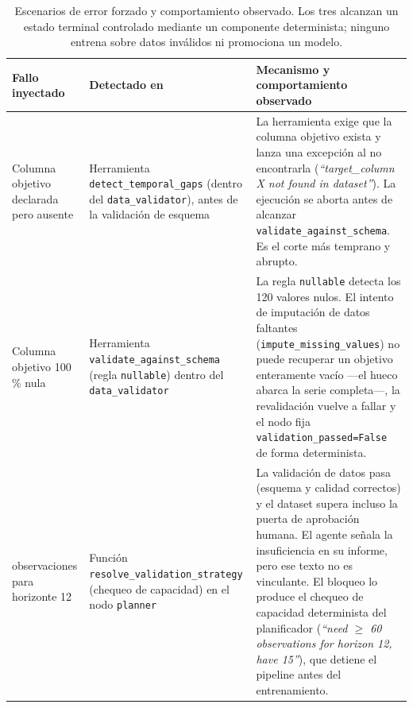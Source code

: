 \documentclass[12pt,a4paper]{article}
\theoremstyle{plain}
\begin{document}
\begin{table}[H]
\centering
\footnotesize
\setlength{\tabcolsep}{4pt}
\renewcommand{\arraystretch}{1.15}
\begin{tabularx}{\linewidth}{>{\RaggedRight\arraybackslash}p{3.2cm} >{\RaggedRight\arraybackslash}p{3.6cm} >{\RaggedRight\arraybackslash}X}
\hline
\textbf{Fallo inyectado} & \textbf{Detectado en} & \textbf{Mecanismo y comportamiento observado} \\\hline
Columna objetivo declarada pero ausente
  & Herramienta \nolinkurl{detect_temporal_gaps} (dentro del \nolinkurl{data_validator}), antes de la validación de esquema
  & La herramienta exige que la columna objetivo exista y lanza una excepción al no encontrarla (\textit{``target\_column X not found in dataset''}). La ejecución se aborta antes de alcanzar \nolinkurl{validate_against_schema}. Es el corte más temprano y abrupto. \\\hline
Columna objetivo 100\,\% nula
  & Herramienta \nolinkurl{validate_against_schema} (regla \nolinkurl{nullable}) dentro del \nolinkurl{data_validator}
  & La regla \nolinkurl{nullable} detecta los 120 valores nulos. El intento de imputación de datos faltantes (\nolinkurl{impute_missing_values}) no puede recuperar un objetivo enteramente vacío —el hueco abarca la serie completa—, la revalidación vuelve a fallar y el nodo fija \texttt{validation\_passed=False} de forma determinista. \\\hline
15 observaciones para horizonte 12
  & Función \nolinkurl{resolve_validation_strategy} (chequeo de capacidad) en el nodo \nolinkurl{planner}
  & La validación de datos pasa (esquema y calidad correctos) y el dataset supera incluso la puerta de aprobación humana. El agente señala la insuficiencia en su informe, pero ese texto no es vinculante. El bloqueo lo produce el chequeo de capacidad determinista del planificador (\textit{``need $\geq$ 60 observations for horizon 12, have 15''}), que detiene el pipeline antes del entrenamiento. \\\hline
\end{tabularx}
\caption{Escenarios de error forzado y comportamiento observado. Los tres alcanzan
 un estado terminal controlado mediante un componente determinista; ninguno entrena
 sobre datos inválidos ni promociona un modelo.}
\label{tab:robustez}
\end{table}
\end{document}

